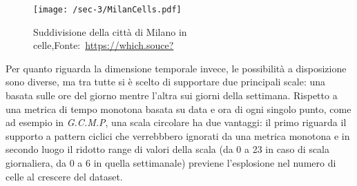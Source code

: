 \begin{figure}
  \centering
  \texttt{[image: /sec-3/MilanCells.pdf]}
  \caption{Suddivisione della città di Milano in celle,Fonte:~\url{https://which.souce?}}%
  \label{fig:chap-3:milan-cell-division}
\end{figure}

Per quanto riguarda la dimensione temporale invece, le possibilità a disposizione sono diverse, ma tra tutte si è scelto di supportare due principali scale: una basata sulle ore del giorno mentre l'altra sui giorni della settimana.
Rispetto a una metrica di tempo monotona basata su data e ora di ogni singolo punto, come ad esempio in \textit{G.C.M.P}, una scala circolare ha due vantaggi: il primo riguarda
il supporto a pattern ciclici che verrebbbero ignorati da una metrica monotona e in secondo luogo il ridotto range di valori della scala (da 0 a 23 in caso di scala giornaliera, da 0 a 6 in quella settimanale)
previene l'esplosione nel numero di celle al crescere del dataset.



